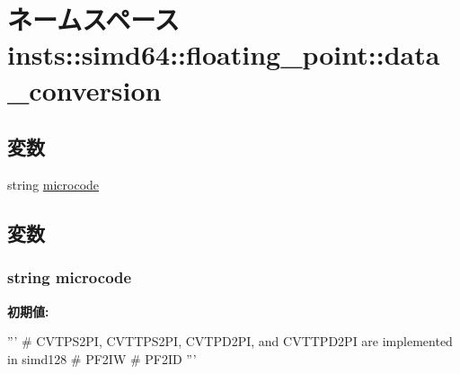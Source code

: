 \hypertarget{namespaceinsts_1_1simd64_1_1floating__point_1_1data__conversion}{
\section{ネームスペース insts::simd64::floating\_\-point::data\_\-conversion}
\label{namespaceinsts_1_1simd64_1_1floating__point_1_1data__conversion}
}
\subsection*{変数}
\begin{DoxyCompactItemize}
\item 
string \hyperlink{namespaceinsts_1_1simd64_1_1floating__point_1_1data__conversion_a770f11a173e99389a8802f0107ed8f52}{microcode}
\end{DoxyCompactItemize}


\subsection{変数}
\hypertarget{namespaceinsts_1_1simd64_1_1floating__point_1_1data__conversion_a770f11a173e99389a8802f0107ed8f52}{
\subsubsection[{microcode}]{\setlength{\rightskip}{0pt plus 5cm}string {\bf microcode}}}
\label{namespaceinsts_1_1simd64_1_1floating__point_1_1data__conversion_a770f11a173e99389a8802f0107ed8f52}
{\bfseries 初期値:}
\begin{DoxyCode}
'''
# CVTPS2PI, CVTTPS2PI, CVTPD2PI, and CVTTPD2PI are implemented in simd128
# PF2IW
# PF2ID
'''
\end{DoxyCode}
